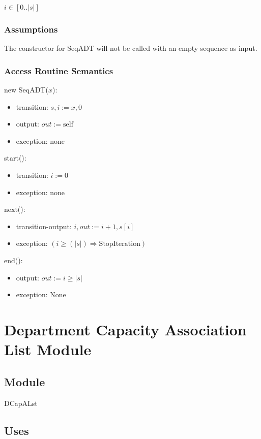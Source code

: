 \documentclass[12pt]{article}
\begin{document}
$i \in [0..|s|]$

\subsubsection* {Assumptions}

The constructor for SeqADT will not be called with an empty sequence as input.

\subsubsection* {Access Routine Semantics}

\noindent new SeqADT($x$):
\begin{itemize}
\item transition: $s, i := x, 0$
\item output: $out := \mbox{self}$
\item exception: none
\end{itemize}

\noindent start():
\begin{itemize}
\item transition: $i := 0$
\item exception: none
\end{itemize}

\noindent next():
\begin{itemize}
\item transition-output: $i, out := i + 1, s[i]$
\item exception: $( i \geq (|s|) \Rightarrow \text{StopIteration})$
\end{itemize}

\noindent end():
\begin{itemize}
\item output: $out := i \geq |s|$
\item exception: None
\end{itemize}

\newpage

\section* {Department Capacity Association List Module}

\subsection*{Module}

DCapALst

\subsection* {Uses}
\end{document}

